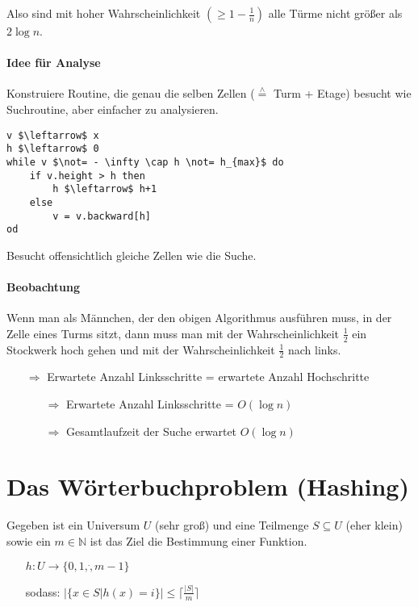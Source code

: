 
\minisec{} Also sind mit hoher Wahrscheinlichkeit $(\geq 1 - \frac{1}{n})$ alle Türme nicht größer als $2 \log n$.

\paragraph*{Idee für Analyse} Konstruiere Routine, die genau die selben Zellen ($\overset{\wedge}{=}$ Turm + Etage) besucht wie Suchroutine, aber einfacher zu analysieren.


\begin{lstlisting}[mathescape]
v $\leftarrow$ x
h $\leftarrow$ 0
while v $\not= - \infty \cap h \not= h_{max}$ do
	if v.height > h then
		h $\leftarrow$ h+1
	else
		v = v.backward[h]
od
\end{lstlisting}
\marginpar{\textcolor{blue}{\scriptsize $v.back-ward[h]$ Verweis auf Turm, der auf $v$ in Höhe $h$ zeigt}}

\minisec{} Besucht offensichtlich gleiche Zellen wie die Suche.

\paragraph*{Beobachtung} Wenn man als Männchen, der den obigen Algorithmus ausführen muss, in der Zelle eines Turms sitzt, dann muss man mit der Wahrscheinlichkeit $\frac{1}{2}$ ein Stockwerk hoch gehen und mit der Wahrscheinlichkeit $\frac{1}{2}$ nach links.
\begin{itemize}
	\item[$\Rightarrow$] Erwartete Anzahl Linksschritte = erwartete Anzahl Hochschritte
	\begin{itemize}
		\item[$\Rightarrow$] Erwartete Anzahl Linksschritte = $O(\log n)$
		\item[$\Rightarrow$] Gesamtlaufzeit der Suche erwartet $O(\log n)$
	\end{itemize}
\end{itemize}

\section{Das Wörterbuchproblem (Hashing)}
Gegeben ist ein Universum $U$ (sehr groß) und eine Teilmenge $S \subseteq U$ (eher klein) sowie ein $m \in \mathbb{N}$ ist das Ziel die Bestimmung einer Funktion.
\begin{itemize}
	\item[] $h : U \rightarrow \{ 0,1,\dot,m-1 \}$
	\item[]sodass: $\big| \{ x \in S | h(x) =i \} \big| \leq \lceil\frac{|S|}{m}\rceil $
\end{itemize}

